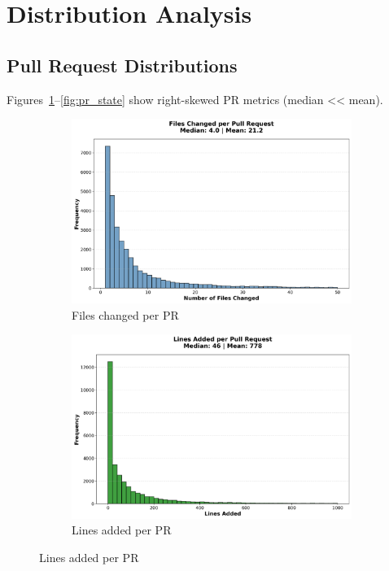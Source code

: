 \documentclass[11pt]{article}
\begin{document}
\section{Distribution Analysis}

\subsection{Pull Request Distributions}

Figures~\ref{fig:pr_files}--\ref{fig:pr_state} show right-skewed PR metrics (median << mean).

\begin{figure}[H]
\centering
\begin{subfigure}[b]{0.48\textwidth}
\centering
\includegraphics[width=\textwidth]{figures_individual/01_pr_files_changed_histogram.png}
\caption{Files changed per PR}
\label{fig:pr_files}
\end{subfigure}
\hfill
\begin{subfigure}[b]{0.48\textwidth}
\centering
\includegraphics[width=\textwidth]{figures_individual/04_pr_lines_added_histogram.png}
\caption{Lines added per PR}
\label{fig:pr_added}
\end{subfigure}


\end{figure}
\end{document}

